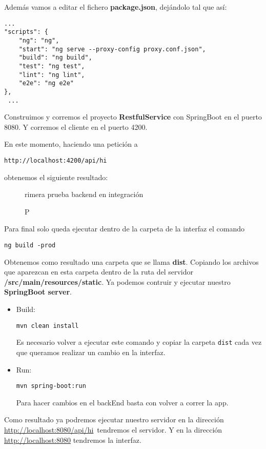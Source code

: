 \documentclass[12pt,a4paper]{article}
\begin{document}
Además vamos a editar el fichero \textbf{package.json}, dejándolo tal que así:

\begin{verbatim}
...
"scripts": {
    "ng": "ng",
    "start": "ng serve --proxy-config proxy.conf.json",
    "build": "ng build",
    "test": "ng test",
    "lint": "ng lint",
    "e2e": "ng e2e"
},
 ...
\end{verbatim}

Construimos y corremos el proyecto \textbf{RestfulService} con SpringBoot en el puerto 8080. Y corremos el cliente en el puerto 4200.

En este momento, haciendo una petición a \begin{verbatim}http://localhost:4200/api/hi\end{verbatim} obtenemos el siguiente resultado:


\begin{figure}[!h]
\centering
{}
\caption Primera prueba backend en integración
\label{itg4}
\end{figure}

Para final solo queda ejecutar dentro de la carpeta de la interfaz el comando \begin{verbatim}ng build -prod\end{verbatim} 

Obtenemos como resultado una carpeta que se llama \textbf{dist}. Copiando los archivos que aparezcan en esta carpeta dentro de la ruta del servidor \textbf{/src/main/resources/static}. Ya podemos contruir y ejecutar nuestro \textbf{SpringBoot server}.


\begin{itemize}
    \item Build: \begin{verbatim}mvn clean install \end{verbatim}
    Es necesario volver a ejecutar este comando y copiar la carpeta \verb|dist| cada vez que queramos realizar un cambio en la interfaz.
    \item Run: \begin{verbatim}mvn spring-boot:run \end{verbatim}
    Para hacer cambios en el backEnd basta con volver a correr la app.
\end{itemize}

Como resultado ya podremos ejecutar nuestro servidor en la dirección
 \url{http://localhost:8080/api/hi}\, tendremos el servidor. Y en la dirección \url{http://localhost:8080} tendremos la interfaz.
\end{document}
